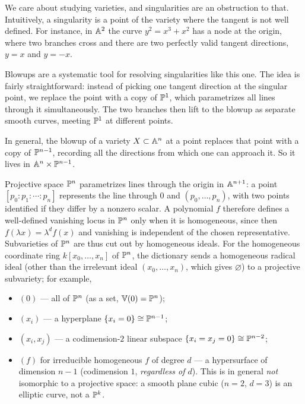 \documentclass[11pt]{article}
\begin{document}
We care about studying varieties, and singularities are an obstruction to that. Intuitively, a singularity is a point of the variety where the tangent is not well defined. For instance, in $\A^2$ the curve $y^2 = x^3 + x^2$ has a node at the origin, where two branches cross and there are two perfectly valid tangent directions, $y = x$ and $y = -x$.

Blowups are a systematic tool for resolving singularities like this one. The idea is fairly straightforward: instead of picking one tangent direction at the singular point, we replace the point with a copy of $\P^1$, which parametrizes all lines through it simultaneously. The two branches then lift to the blowup as separate smooth curves, meeting $\P^1$ at different points.

In general, the blowup of a variety $X \subset \A^n$ at a point replaces that point with a copy of $\P^{n-1}$, recording all the directions from which one can approach it. So it lives in $\A^n \times \P^{n-1}$.

Projective space $\P^n$ parametrizes lines through the origin in $\A^{n+1}$: a point $[p_0 : p_1 : \cdots : p_n]$ represents the line through $0$ and $(p_0, \ldots, p_n)$, with two points identified if they differ by a nonzero scalar. A polynomial $f$ therefore defines a well-defined vanishing locus in $\P^n$ only when it is homogeneous, since then $f(\lambda x) = \lambda^d f(x)$ and vanishing is independent of the chosen representative. Subvarieties of $\P^n$ are thus cut out by homogeneous ideals. For the homogeneous coordinate ring $k[x_0, \ldots, x_n]$ of $\P^n$, the dictionary sends a homogeneous radical ideal (other than the irrelevant ideal $(x_0, \ldots, x_n)$, which gives $\varnothing$) to a projective subvariety; for example,
\begin{itemize}[topsep=2pt,itemsep=1pt]
    \item $(0)$ --- all of $\P^n$ (as a set, $\V(0) = \P^n$);
    \item $(x_i)$ --- a hyperplane $\{x_i = 0\} \iso \P^{n-1}$;
    \item $(x_i, x_j)$ --- a codimension-$2$ linear subspace $\{x_i = x_j = 0\} \iso \P^{n-2}$;
    \item $(f)$ for irreducible homogeneous $f$ of degree $d$ --- a hypersurface of dimension $n-1$ (codimension $1$, \emph{regardless of $d$}). This is in general \emph{not} isomorphic to a projective space: a smooth plane cubic ($n=2$, $d=3$) is an elliptic curve, not a $\P^k$.
\end{itemize}
\end{document}
